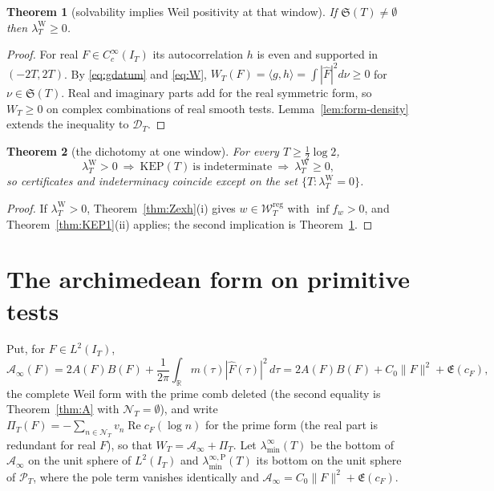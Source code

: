 \documentclass[10pt]{amsart}
\newtheorem{theorem}{Theorem}[section]
\theoremstyle{definition}
\theoremstyle{remark}
\newcommand{\R}{\mathbb R}
\newcommand{\Rel}{\operatorname{Re}}
\newcommand{\PT}{\mathcal P_T}
\newcommand{\IT}{I_T}
\newcommand{\lamW}{\lambda^{\mathrm W}_T}
\newcommand{\Fh}{\widehat F}
\newcommand{\cF}{c_F}
\newcommand{\Lev}{\mathfrak E}
\newcommand{\Wcl}{\mathcal W_T}
\newcommand{\NT}{\mathcal N_T}
\newcommand{\Ainf}{\mathcal A_\infty}
\newcommand{\PiT}{\Pi_T}
\newcommand{\laminf}{\lambda^{\infty}_{\min}}
\newcommand{\laminfP}{\lambda^{\infty,\mathrm P}_{\min}}
\begin{document}
\begin{theorem}[solvability implies Weil positivity at that window]\label{thm:KEP2}
If $\mathfrak S(T)\ne\emptyset$ then $\lamW\ge0$.
\end{theorem}
\begin{proof}
For real $F\in C_c^\infty(\IT)$ its autocorrelation $h$ is even and
supported in $(-2T,2T)$. By \eqref{eq:gdatum} and \eqref{eq:W},
$W_T(F)=\langle g,h\rangle=\int|\Fh|^2d\nu\ge0$ for $\nu\in\mathfrak S(T)$.
Real and imaginary parts add for the real symmetric form, so $W_T\ge0$ on
complex combinations of real smooth tests. Lemma~\ref{lem:form-density}
extends the inequality to $\mathcal D_T$.
\end{proof}

\begin{theorem}[the dichotomy at one window]\label{thm:KEPdich}
For every $T\ge\frac12\log2$,
\[
\lamW>0\ \Longrightarrow\ \mathrm{KEP}(T)\ \text{is indeterminate}\ \Longrightarrow\ \lamW\ge0 ,
\]
so certificates and indeterminacy coincide except on the set $\{T:\lamW=0\}$.
\end{theorem}
\begin{proof}
If $\lamW>0$, Theorem~\ref{thm:Zexh}(i) gives $w\in\Wcl^{\mathrm{reg}}$ with $\inf f_w>0$, and
Theorem~\ref{thm:KEP1}(ii) applies; the second implication is Theorem~\ref{thm:KEP2}.
\end{proof}

\section{The archimedean form on primitive tests}\label{sec:archstr}

Put, for $F\in L^2(\IT)$,
\[
\Ainf(F)=2A(F)B(F)+\frac1{2\pi}\int_\R m(\tau)|\Fh(\tau)|^2\,d\tau
=2A(F)B(F)+C_0\|F\|^2+\Lev(\cF),
\]
the complete Weil form with the prime comb deleted (the second equality is Theorem~\ref{thm:A} with
$\NT=\emptyset$), and write $\PiT(F)=-\sum_{n\in\NT}v_n\Rel\cF(\log n)$ for the prime form (the real part is redundant for real $F$), so that
$W_T=\Ainf+\PiT$. Let $\laminf(T)$ be the bottom of $\Ainf$ on the unit sphere of $L^2(\IT)$ and
$\laminfP(T)$ its bottom on the unit sphere of $\PT$, where the pole term vanishes identically and
$\Ainf=C_0\|F\|^2+\Lev(\cF)$.
\end{document}
